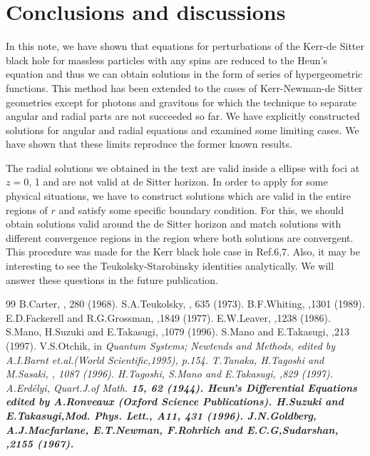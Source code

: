 
\section{Conclusions and discussions}

In this note, we have shown that equations for perturbations of 
the Kerr-de Sitter black hole for massless particles with any spins 
are reduced to the Heun's equation and thus we can obtain solutions 
in the form of series of hypergeometric functions. This method 
has been extended to the cases of Kerr-Newman-de Sitter geometries 
except for photons and gravitons for which the technique to 
separate angular and radial parts are not succeeded so far.  
We have explicitly constructed solutions for angular and radial 
equations and examined some limiting cases. We have shown that these 
limits reproduce the former known results.

The radial solutions we obtained in the text are valid 
inside a ellipse with foci at 
$z=0$, 1 and are not valid at de Sitter horizon.  In order 
to apply for some physical situations, we have to construct 
solutions which are valid in the entire regions of $r$ and 
satisfy some specific boundary condition. For this, we 
should obtain solutions valid around the de Sitter horizon and 
match solutions with different convergence regions in the region 
where both solutions are convergent. This procedure was made 
for the Kerr black hole case in Ref.6,7. Also, it may be interesting 
to see the Teukolsky-Starobinsky identities analytically. 
We will answer these questions in the future publication. 

\newpage
\begin{thebibliography}{99}
B.Carter,
, 280 (1968).
S.A.Teukolsky,
, 635 (1973).
B.F.Whiting,
,1301 (1989).
E.D.Fackerell and R.G.Grossman,
,1849 (1977).
E.W.Leaver,
,1238 (1986).
S.Mano, H.Suzuki and E.Takasugi, ,1079 (1996).
S.Mano and E.Takasugi, ,213 (1997).
V.S.Otchik, in \it Quantum Systems; Newtends and Methods, 
\rm edited by A.I.Barnt et.al.(World Scientific,1995), p.154.
T.Tanaka, H.Tagoshi and M.Sasaki, 
, 1087 (1996).
H.Tagoshi, S.Mano and E.Takasugi, ,829 (1997).
A.Erd\'{e}lyi, Quart.J.of Math. \bf 15\rm, 62 (1944).
{\it Heun's Differential Equations} edited by A.Ronveaux 
(Oxford Science Publications).
H.Suzuki and E.Takasugi,Mod. Phys. Lett., A\bf 11\rm, 431 (1996).
J.N.Goldberg, A.J.Macfarlane, E.T.Newman, F.Rohrlich and
E.C.G,Sudarshan, 
,2155 (1967).
\end{thebibliography}






